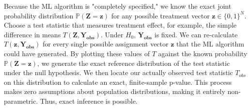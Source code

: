 \begin{solution}
Because the ML algorithm is "completely specified," we know the exact joint probability distribution $\mathbb{P}(\mathbf{Z} = \mathbf{z})$ for any possible treatment vector $\mathbf{z} \in \{0, 1\}^N$.
Choose a test statistic that measures treatment effect, for example, the simple difference in means $T(\mathbf{Z}, \mathbf{Y_{obs}})$.
Under $H_0$, $\mathbf{Y_{obs}}$ is fixed. We can re-calculate $T(\mathbf{z}, \mathbf{Y_{obs}})$ for every single possible assignment vector $\mathbf{z}$ that the ML algorithm could have generated.
By plotting these values of $T$ against the known probability $\mathbb{P}(\mathbf{Z} = \mathbf{z})$, we generate the exact reference distribution of the test statistic under the null hypothesis.
We then locate our actually observed test statistic $T_{obs}$ on this distribution to calculate an exact, finite-sample p-value. This process makes zero assumptions about population distributions, making it entirely non-parametric. Thus, exact inference is possible.
\end{solution}
